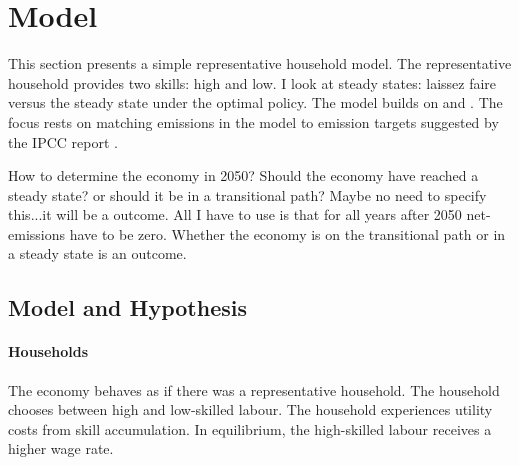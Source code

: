 \section{Model}
This section presents a simple representative household model. The representative household provides two skills: high and low. I look at steady states: laissez faire versus the steady state under the optimal policy. 
The model builds on \cite{Acemoglu2012TheChange} and \cite{Heathcote2017OptimalFramework}. 
The focus rests on matching emissions in the model to emission targets suggested by the IPCC report \citep{Rogelj2018MitigationDevelopment.}. 

How to determine the economy in 2050? Should the economy have reached a steady state? or should it be in a transitional path? Maybe no need to specify this...it will be a outcome. All I have to use is that for all years after 2050 net-emissions have to be zero. Whether the economy is on the transitional path or in a steady state is an outcome. 
\subsection{Model and Hypothesis}

\paragraph{Households}
The economy behaves as if there was a representative household. The household chooses between high and low-skilled labour. The household experiences utility costs from skill accumulation. In equilibrium, the high-skilled labour receives a higher wage rate. 

